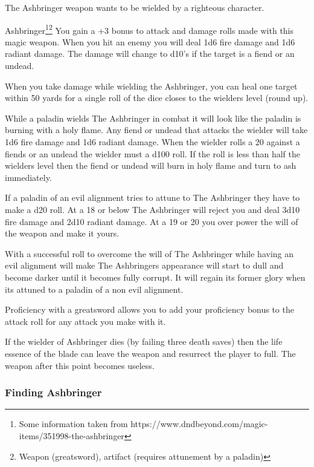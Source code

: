 The Ashbringer weapon wants to be wielded by a righteous character. 

\begin{commentbox}{Ashbringer\footnote{Some information taken from https://www.dndbeyond.com/magic-items/351998-the-ashbringer}\footnote{Weapon (greatsword), artifact (requires attunement by a paladin)}}
	You gain a +3 bonus to attack and damage rolls made with this magic weapon. When you hit an enemy you will deal 1d6 fire damage and 1d6 radiant damage. The damage will change to d10's if the target is a fiend or an undead.
	
	When you take damage while wielding the Ashbringer, you can heal one target within 50 yards for a single roll of the dice closes to the wielders level (round up).
	
	While a paladin wields The Ashbringer in combat it will look like the paladin is burning with a holy flame. Any fiend or undead that attacks the wielder will take 1d6 fire damage and 1d6 radiant damage. When the wielder rolls a 20 against a fiends or an undead the wielder must a d100 roll. If the roll is less than half the wielders level then the fiend or undead will burn in holy flame and turn to ash immediately.
	
	If a paladin of an evil alignment tries to attune to The Ashbringer they have to make a d20 roll. At a 18 or below The Ashbringer will reject you and deal 3d10 fire damage and 2d10 radiant damage. At a 19 or 20 you over power the will of the weapon and make it yours.
	
	With a successful roll to overcome the will of The Ashbringer while having an evil alignment will make The Ashbringers appearance will start to dull and become darker until it becomes fully corrupt. It will regain its former glory when its attuned to a paladin of a non evil alignment.
	
	Proficiency with a greatsword allows you to add your proficiency bonus to the attack roll for any attack you make with it.
	
	If the wielder of Ashbringer dies (by failing three death saves) then the life essence of the blade can leave the weapon and resurrect the player to full. The weapon after this point becomes useless.
\end{commentbox}

\subsubsection{Finding Ashbringer}

